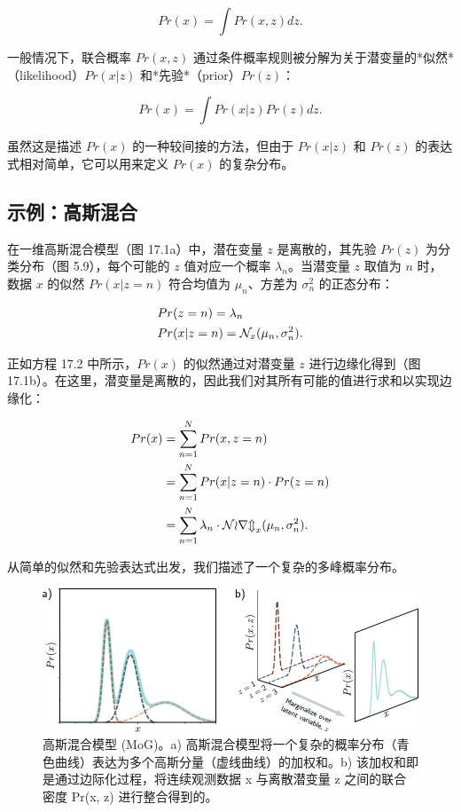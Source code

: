 \documentclass[lang=cn,newtx,10pt,scheme=chinese]{elegantbook}
\begin{document}
\begin{equation}
Pr(x) = \int Pr(x, z)dz. 
\end{equation}

一般情况下，联合概率 \(Pr(x, z)\) 通过条件概率规则被分解为关于潜变量的*似然*（likelihood）\(Pr(x|z)\) 和*先验*（prior）\(Pr(z)\)：

\begin{equation}
Pr(x) = \int Pr(x|z)Pr(z)dz. 
\end{equation}

虽然这是描述 \(Pr(x)\) 的一种较间接的方法，但由于 \(Pr(x|z)\) 和 \(Pr(z)\) 的表达式相对简单，它可以用来定义 \(Pr(x)\) 的复杂分布。

\subsection{示例：高斯混合}

在一维高斯混合模型（图 17.1a）中，潜在变量 \(z\) 是离散的，其先验 \(Pr(z)\) 为分类分布（图 5.9），每个可能的 \(z\) 值对应一个概率 \(\lambda_n\)。当潜变量 \(z\) 取值为 \(n\) 时，数据 \(x\) 的似然 \(Pr(x|z = n)\) 符合均值为 \(\mu_n\)、方差为 \(\sigma^2_n\) 的正态分布：


\begin{align}
&Pr(z = n) = \lambda_n \notag \\
&Pr(x|z = n) = \mathcal{N}_{x}(\mu_n, \sigma^2_n). 
\end{align} 


正如方程 17.2 中所示，\(Pr(x)\) 的似然通过对潜变量 \(z\) 进行边缘化得到（图 17.1b）。在这里，潜变量是离散的，因此我们对其所有可能的值进行求和以实现边缘化：


\begin{align}
Pr(x) &= \sum_{n=1}^{N} Pr(x, z = n) \notag \\
&= \sum_{n=1}^{N} Pr(x|z = n) \cdot Pr(z = n) \notag \\
&= \sum_{n=1}^{N} \lambda_n \cdot \mathcal{Norm}_x(\mu_n, \sigma^2_n). 
\end{align} 


从简单的似然和先验表达式出发，我们描述了一个复杂的多峰概率分布。

\begin{figure}[ht!]
\centering
\includegraphics[width=0.7\linewidth]{PDFFigures/UDLChap17PDF/VAEMixGauss.pdf}
\caption{高斯混合模型 (MoG)。a) 高斯混合模型将一个复杂的概率分布（青色曲线）表达为多个高斯分量（虚线曲线）的加权和。b) 该加权和即是通过边际化过程，将连续观测数据 x 与离散潜变量 z 之间的联合密度 Pr(x, z) 进行整合得到的。}
\end{figure}
\end{document}
